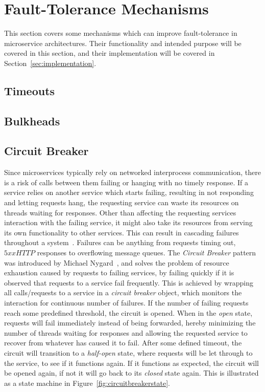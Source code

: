 \section{Fault-Tolerance Mechanisms}
This section covers some mechanisms which can improve fault-tolerance in
microservice architectures. Their functionality and intended purpose will
be covered in this section, and their implementation will be covered in 
Section~\ref{sec:implementation}.

\subsection{Timeouts}

\subsection{Bulkheads}

\subsection{Circuit Breaker}
Since microservices typically rely on networked interprocess communication,
there is a risk of calls between them failing or hanging with no timely
response.
If a service relies on another service which starts failing, resulting in not
responding and letting requests hang, the requesting service can waste its
resources on threads waiting for responses. Other than affecting the requesting
services interaction with the failing service, it might also take its resources
from serving its own functionality to other services. This can result in
cascading failures throughout a system~\cite{fowler2014blog}.
Failures can be anything from requests timing out, $5xx HTTP$ responses to
overflowing message queues. 
\newline\newline
The \textit{Circuit Breaker} pattern was introduced by Michael
Nygard~\cite{nygard2007release}, and solves the problem of resource exhaustion
caused by requests to failing services, by failing quickly if it is observed
that requests to a service fail frequently. 
This is achieved by wrapping all calls/requests to a service in a
\textit{circuit breaker} object, which monitors the interaction for continuous
number of failures. 
If the number of failing requests reach some predefined threshold, the circuit
is opened. 
\newline\newline
When in the \textit{open} state, requests will fail immediately instead of being
forwarded, hereby minimizing the number of threads waiting for responses and
allowing the requested service to recover from whatever has caused it to fail.
After some defined timeout, the circuit will transition to a \textit{half-open}
state, where requests will be let through to the service, to see if it functions
again. If it functions as expected, the circuit will be opened again, if not it
will go back to its \textit{closed} state again. This is illustrated as a state
machine in Figure~\ref{fig:circuitbreakerstate}.

